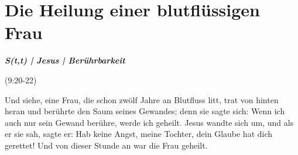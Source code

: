 \newpage
\section{Die Heilung einer blutflüssigen Frau}

\textbf{\textit{S(t,t) | Jesus | Berührbarkeit}}


(9:20-22)
\begin{BibelSt}
Und siehe, eine Frau, die schon zwölf Jahre an Blutfluss litt, trat von hinten heran und berührte den Saum seines Gewandes; denn sie sagte sich: Wenn ich auch nur sein Gewand berühre, werde ich geheilt. Jesus wandte sich um, und als er sie sah, sagte er: Hab keine Angst, meine Tochter, dein Glaube hat dich gerettet! Und von dieser Stunde an war die Frau geheilt. 
\end{BibelSt}

